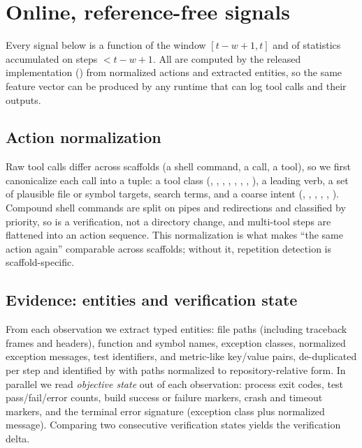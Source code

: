 \section{Online, reference-free signals}
\label{sec:method}

Every signal below is a function of the window $[t-w+1,t]$ and of statistics accumulated on steps
$<t-w+1$. All are computed by the released implementation () from normalized
actions and extracted entities, so the same feature vector can be produced by any runtime that can log
tool calls and their outputs.

\subsection{Action normalization}
Raw tool calls differ across scaffolds (a shell command, a  call, a  tool),
so we first canonicalize each call into a tuple: a tool class (, , ,
, , , , ), a leading verb, a set of
plausible file or symbol targets, search terms, and a coarse intent (, ,
, , , ). Compound shell commands are split on pipes and
redirections and classified by priority, so  is a verification, not a
directory change, and multi-tool steps are flattened into an action sequence. This normalization is what
makes ``the same action again'' comparable across scaffolds; without it, repetition detection is
scaffold-specific.

\subsection{Evidence: entities and verification state}
From each observation we extract typed entities: file paths (including traceback frames and
\code{[File:...]} headers), function and symbol names, exception classes, normalized exception messages,
test identifiers, and metric-like key/value pairs, de-duplicated per step and identified by
 with paths normalized to repository-relative form. In parallel we read \emph{objective
state} out of each observation: process exit codes, test pass/fail/error counts, build success or
failure markers, crash and timeout markers, and the terminal error signature (exception class plus
normalized message). Comparing two consecutive verification states yields the verification delta.

